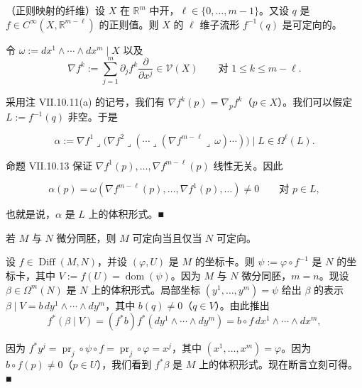\begin{example}
\begin{items}
（正则映射的纤维）设 $ X $ 在 $ \mathbb{R}^{m} $ 中开，$ \ell \in \{ 0, \ldots, m-1 \} $。又设 $ q $ 是 $ f \in C^{\infty}(X, \mathbb{R}^{m-\ell}) $ 的正则值。则 $ X $ 的 $ \ell $ 维子流形 $ f^{-1}(q) $ 是可定向的。

\proofhead
令 $ \omega := dx^{1} \wedge \cdots \wedge dx^{m} \mid X $ 以及
\[
\nabla f^{k} := \sum_{j=1}^{m} \partial_j f^{k} \frac{\partial}{\partial x^{j}} \in \mathcal{V}(X) \qquad \text{对 } 1 \le k \le m - \ell .
\]

采用注 VII.10.11(a) 的记号，我们有 $ \nabla f^{k}(p) = \nabla_{p}f^{k} $（$ p \in X $）。我们可以假定 $ L := f^{-1}(q) $ 非空。于是

\[
\alpha := \nabla f^{1} \lrcorner \big( \nabla f^{2} \lrcorner ( \cdots \lrcorner ( \nabla f^{m-\ell} \lrcorner\, \omega ) \cdots ) \big) \mid L \in \Omega^{\ell}(L) .
\]

命题 VII.10.13 保证 $ \nabla f^{1}(p), \ldots, \nabla f^{m-\ell}(p) $ 线性无关。因此

\[
\alpha(p) = \omega(\nabla f^{m-\ell}(p), \ldots, \nabla f^{1}(p), \ldots) \neq 0 \qquad \text{对 } p \in L ,
\]

也就是说，$ \alpha $ 是 $ L $ 上的体积形式。\nobreak\hspace{0.35em}■

\item

若 $ M $ 与 $ N $ 微分同胚，则 $ M $ 可定向当且仅当 $ N $ 可定向。

\proofhead
设 $ f \in \operatorname{Diff}(M,N) $，并设 $ (\varphi, U) $ 是 $ M $ 的坐标卡。则 $ \psi := \varphi \circ f^{-1} $ 是 $ N $ 的坐标卡，其中 $ V := f(U) = \operatorname{dom}(\psi) $。因为 $ M $ 与 $ N $ 微分同胚，$ m = n $。现设 $ \beta \in \Omega^{m}(N) $ 是 $ N $ 上的体积形式。局部坐标 $ (y^{1}, \ldots, y^{m}) = \psi $ 给出 $ \beta $ 的表示 $ \beta \mid V = b\,dy^{1} \wedge \cdots \wedge dy^{m} $，其中 $ b(q) \neq 0 $（$ q \in V $）。由此推出
\[
f^{*}(\beta \mid V) = (f^{*}b)f^{*}(dy^{1} \wedge \cdots \wedge dy^{m}) = b \circ f\,dx^{1} \wedge \cdots \wedge dx^{m} ,
\]

因为 $ f^{*}y^{j} = \operatorname{pr}_j \circ \psi \circ f = \operatorname{pr}_j \circ \varphi = x^{j} $，其中 $ (x^{1}, \ldots, x^{m}) = \varphi $。因为 $ b \circ f(p) \neq 0 $（$ p \in U $），我们看到 $ f^{*}\beta $ 是 $ M $ 上的体积形式。现在断言立刻可得。\nobreak\hspace{0.35em}■

\item


\end{items}
\end{example}

